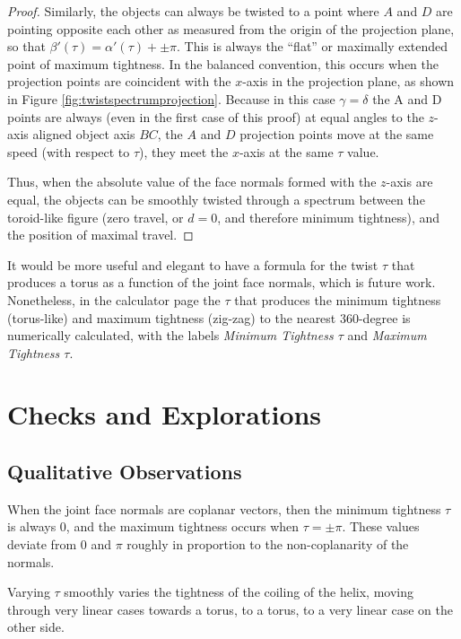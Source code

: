 \documentclass[11pt]{article}
\begin{document}
{\begin{proof}
    Similarly, the objects can always be twisted to a point where $A$ and $D$ are pointing opposite each other
    as measured from the origin of the projection plane, so that
    $\beta'(\tau) = \alpha'(\tau) + \pm \pi$.
    This is always the ``flat'' or maximally
    extended point of maximum tightness.
    In the balanced convention, this occurs when the projection points are
    coincident with the $x$-axis in the projection plane, as shown in Figure \ref{fig:twistspectrumprojection}.
    Because in this case $\gamma = \delta$ the A and D points are always (even in the first case of this proof)
    at equal angles to the $z$-axis aligned object axis $BC$, the $A$ and $D$ projection points move
    at the same speed (with respect to $\tau$), they meet the $x$-axis at the same $\tau$ value.

    Thus, when the absolute value of the face normals formed with the $z$-axis are equal,
    the objects can be smoothly twisted through a spectrum between the toroid-like
    figure (zero travel, or $d = 0$, and therefore minimum tightness), and the position of maximal travel.

\end{proof}


It would be more useful and elegant to have a formula for the twist $\tau$ that produces
a torus as a function of the joint face normals, which is future work.
Nonetheless, in the calculator page
the $\tau$ that produces the minimum tightness (torus-like) and maximum tightness (zig-zag) to the
nearest 360-degree is numerically calculated,
with the labels {\em Minimum Tightness $\tau$} and {\em Maximum Tightness $\tau$}.

\section{Checks and Explorations}

\subsection{Qualitative Observations}

When the joint face normals are coplanar vectors, then the minimum tightness $\tau$ is
always $0$, and the maximum tightness occurs when $\tau = \pm \pi$.
These values deviate from $0$ and $\pi$ roughly in proportion
to the non-coplanarity of the normals.

Varying $\tau$ smoothly varies the tightness of the coiling of the helix,
moving through very linear cases towards a torus,
to a torus, to a very linear case on the other side.

}
\end{document}
